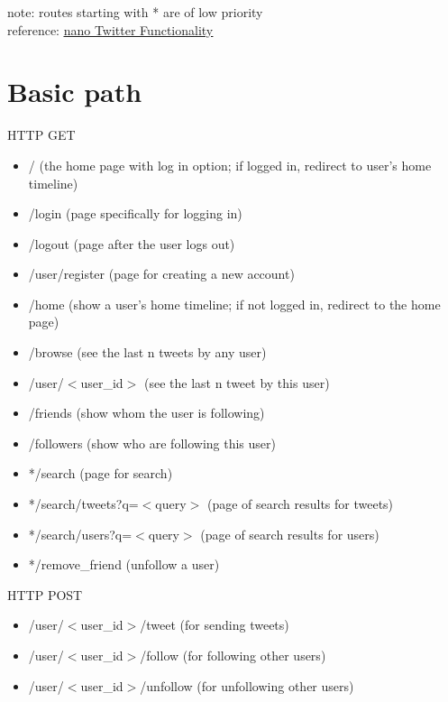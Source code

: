 \documentclass{article}
\begin{document}
	\noindent note: routes starting with * are of low priority \\
	reference: \href{http://cosi105b-f2016.s3-website-us-west-2.amazonaws.com/content/nt/01_nt_functionality.md/}{\underline{nano Twitter Functionality}}
	\section{Basic path}
	HTTP GET
	\begin{itemize}
		\item / (the home page with log in option; if logged in, redirect to user's home timeline)
		\item /login (page specifically for logging in)
		\item /logout (page after the user logs out)
		\item /user/register (page for creating a new account)
		\item /home (show a user's home timeline; if not logged in, redirect to the home page)
		\item /browse (see the last n tweets by any user)
		\item /user/$<$user\_id$>$ (see the last n tweet by this user)
		\item /friends (show whom the user is following)
		\item /followers (show who are following this user)
		\item */search (page for search)
		\item */search/tweets?q=$<$query$>$ (page of search results for tweets)
		\item */search/users?q=$<$query$>$ (page of search results for users)
		\item */remove\_friend (unfollow a user)
	\end{itemize}
	HTTP POST
	\begin{itemize}
		\item /user/$<$user\_id$>$/tweet (for sending tweets)
		\item /user/$<$user\_id$>$/follow (for following other users)
		\item /user/$<$user\_id$>$/unfollow (for unfollowing other users)
	\end{itemize}
	
\end{document}
